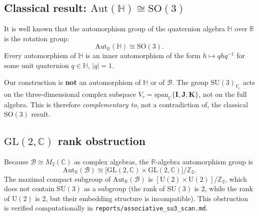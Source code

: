 %
%


\subsection{Classical result: $\mathrm{Aut}(\mathbb{H}) \cong \mathrm{SO}(3)$}

It is well known \cite{Porteous1995} that the automorphism group of the
quaternion algebra $\mathbb{H}$ over $\mathbb{R}$ is the rotation group:
\[
  \mathrm{Aut}_\mathbb{R}(\mathbb{H}) \cong \mathrm{SO}(3).
\]
Every automorphism of $\mathbb{H}$ is an inner automorphism of the form
$h\mapsto qhq^{-1}$ for some unit quaternion $q\in\mathbb{H}$, $|q|=1$.

Our construction is \textbf{not} an automorphism of $\mathbb{H}$ or of
$\mathcal{B}$.  The group $\mathrm{SU}(3)_{V_c}$ acts on the three-dimensional
complex subspace $V_c=\mathrm{span}_\mathbb{C}\{\mathbf{I},\mathbf{J},\mathbf{K}\}$,
not on the full algebra.  This is therefore \emph{complementary to}, not a
contradiction of, the classical $\mathrm{SO}(3)$ result.

\subsection{$\mathrm{GL}(2,\mathbb{C})$ rank obstruction}

Because $\mathcal{B}\cong M_2(\mathbb{C})$ as complex algebras, the
$\mathbb{R}$-algebra automorphism group is
\[
  \mathrm{Aut}_\mathbb{R}(\mathcal{B})
  \cong \bigl[\mathrm{GL}(2,\mathbb{C})\times\mathrm{GL}(2,\mathbb{C})\bigr]/\mathbb{Z}_2.
\]
The maximal compact subgroup of $\mathrm{Aut}_\mathbb{R}(\mathcal{B})$ is
$[\mathrm{U}(2)\times\mathrm{U}(2)]/\mathbb{Z}_2$, which does not contain
$\mathrm{SU}(3)$ as a subgroup (the rank of $\mathrm{SU}(3)$ is $2$, while
the rank of $\mathrm{U}(2)$ is $2$, but their embedding structure is
incompatible).  This obstruction is verified computationally in
\texttt{reports/associative\_su3\_scan.md}.

